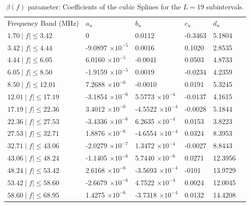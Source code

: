 \documentclass[journal]{IEEEtran}
\begin{document}
\begin{table}[h!]
	\setlength\extrarowheight{4.5pt}
	\centering
	\caption{$\beta(f)$ parameter: Coefficients of the cubic Splines for the $L=19$ subintervals.}
	\label{table_beta}
	\begin{tabular}{|C{3.5cm}|C{2.5cm}|C{2.5cm}|C{2.5cm}|C{2.5cm}|m{0cm}}
		Frequency Band (MHz)           		   & $a_u$    			   & $b_u$      			  & $c_u$   		 		& $d_u$ &\\ 
		$1.70 \mid f\mid \leq 3.42$   & 0 						   & 0.0112 				  & -0.3463 				& 5.1804  &\\ 
		$3.42 \mid f\mid \leq 4.44$   & -9.0897 $\times 10^{-5}$  & 0.0016 				  & 0.1020  				& 2.8535  &\\ 
		$4.44 \mid f\mid \leq 6.05$   & 6.0160  $\times 10^{-5}$  & -0.0041 				  & 0.0503 					& 4.8733  &\\ 
		$6.05 \mid f\mid \leq 8.50$   & -1.9159 $\times 10^{-5}$  & 0.0019 				  & -0.0234 				& 4.2359  &\\ 
		$8.50 \mid f\mid \leq 12.01$  & 7.2688  $\times 10^{-6}$  & -0.0010 				  & 0.0191 					& 5.3245  &\\ 
		$12.01 \mid f\mid \leq 17.19$ & -3.1854 $\times 10^{-6}$  & 5.5773 $\times 10^{-4}$  & -0.0137 				& 4.1615  &\\ 
		$17.19 \mid f\mid \leq 22.36$ & 3.4012 $\times 10^{-6}$   & -4.5522 $\times 10^{-4}$ & -0.0028  				& 5.1844  &\\ 
		$22.36 \mid f\mid \leq 27.53$ & -3.4336 $\times 10^{-6}$  & 6.2635 $\times 10^{-4}$  & 0.0153 					& 3.8223  &\\ 
		$27.53 \mid f\mid \leq 32.71$ & 1.8876  $\times 10^{-6}$  & -4.6554 $\times 10^{-4}$ & 0.0324 					& 8.3953  &\\ 
		$32.71 \mid f\mid \leq 43.06$ & -2.0279 $\times 10^{-7}$  & 1.3472 $\times 10^{-4}$  & -0.0027 				& 8.8443  &\\ 
		$43.06 \mid f\mid \leq 48.24$ & -1.1405  $\times 10^{-6}$ & 5.7440 $\times 10^{-6}$  & 0.0271  				& 12.3956 &\\ 
		$48.24 \mid f\mid \leq 53.42$ & 2.6168  $\times 10^{-6}$  & -3.5693 $\times 10^{-4}$ & -0101 					& 13.9729 &\\ 
		$53.42 \mid f\mid \leq 58.60$ & -2.6679 $\times 10^{-6}$  & 4.7522 $\times 10^{-4}$  & 0.0024 					& 12.0045 &\\ 
		$58.60 \mid f\mid \leq 68.95$ & 1.4275  $\times 10^{-6}$  & -3.7318 $\times 10^{-4}$ & 0.0132 					& 14.4208 &\\ 

\end{tabular}
\end{table}
\end{document}
